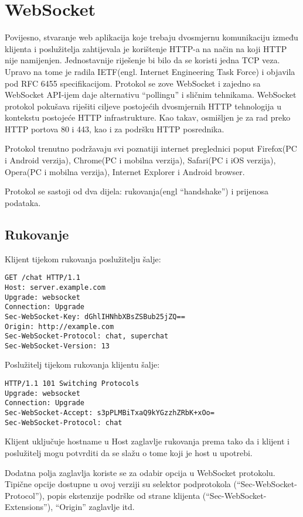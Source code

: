 \documentclass[times, utf8, zavrsni]{fer}
\begin{document}
\section{WebSocket}
Povijesno, stvaranje web aplikacija koje trebaju dvosmjernu komunikaciju između klijenta i poslužitelja zahtijevala je korištenje HTTP-a na način na koji HTTP nije namijenjen. Jednostavnije riješenje bi bilo da se koristi jedna TCP veza. Upravo na tome je radila IETF(engl. Internet Engineering Task Force) i objavila pod RFC 6455 specifikacijom. Protokol se zove WebSocket i zajedno sa WebSocket API-ijem daje alternativu ``pollingu'' i sličnim tehnikama. WebSocket protokol pokušava riješiti ciljeve postojećih dvosmjernih HTTP tehnologija u kontekstu postojeće HTTP infrastrukture. Kao takav, osmišljen je za rad preko HTTP portova 80 i 443, kao i za podršku HTTP posrednika.

Protokol trenutno podržavaju svi poznatiji internet preglednici poput Firefox(PC i Android verzija), Chrome(PC i mobilna verzija), Safari(PC i iOS verzija), Opera(PC i mobilna verzija), Internet Explorer i Android browser.

Protokol se sastoji od dva dijela: rukovanja(engl ``handshake'') i prijenosa podataka.

\subsection{Rukovanje}
Klijent tijekom rukovanja poslužitelju šalje:
\begin{lstlisting}
GET /chat HTTP/1.1
Host: server.example.com
Upgrade: websocket
Connection: Upgrade
Sec-WebSocket-Key: dGhlIHNhbXBsZSBub25jZQ==
Origin: http://example.com
Sec-WebSocket-Protocol: chat, superchat
Sec-WebSocket-Version: 13
\end{lstlisting}

Poslužitelj tijekom rukovanja klijentu šalje:
\begin{lstlisting}
HTTP/1.1 101 Switching Protocols
Upgrade: websocket
Connection: Upgrade
Sec-WebSocket-Accept: s3pPLMBiTxaQ9kYGzzhZRbK+xOo=
Sec-WebSocket-Protocol: chat
\end{lstlisting}

Klijent uključuje hostname u Host zaglavlje rukovanja prema tako da i klijent i poslužitelj mogu potvrditi da se slažu o tome koji je host u upotrebi.

Dodatna polja zaglavlja koriste se za odabir opcija u WebSocket protokolu. Tipične opcije dostupne u ovoj verziji su selektor podprotokola (``Sec-WebSocket-Protocol''), popis ekstenzije podrške od strane klijenta (``Sec-WebSocket-Extensions''), ``Origin'' zaglavlje itd. 
\end{document}
